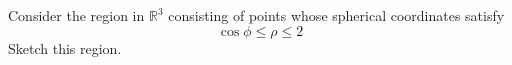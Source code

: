 \begin{problem}
Consider the region in $\mathbb{R}^3$ consisting of points whose spherical coordinates satisfy
\[
\cos\phi \leq \rho \leq 2
\]
Sketch this region.
\end{problem}